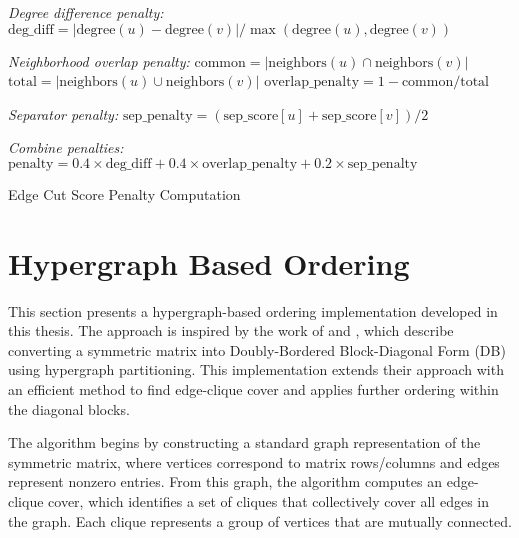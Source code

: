 \begin{algorithm}[H]

    \BlankLine

    \emph{Degree difference penalty:}\;
    $\text{deg\_diff} = |\text{degree}(u) - \text{degree}(v)| / \max(\text{degree}(u), \text{degree}(v))$\;
    \BlankLine

    \emph{Neighborhood overlap penalty:}\;
    $\text{common} = |\text{neighbors}(u) \cap \text{neighbors}(v)|$\;
    $\text{total} = |\text{neighbors}(u) \cup \text{neighbors}(v)|$\;
    $\text{overlap\_penalty} = 1 - \text{common} / \text{total}$\;
    \BlankLine

    \emph{Separator penalty:}\;
    $\text{sep\_penalty} = (\text{sep\_score}[u] + \text{sep\_score}[v]) / 2$\;
    \BlankLine

    \emph{Combine penalties:}\;
    $\text{penalty} = 0.4 \times \text{deg\_diff} + 0.4 \times \text{overlap\_penalty} + 0.2 \times \text{sep\_penalty}$\;

    \;

    \caption{Edge Cut Score Penalty Computation}
    \label{alg:edge_penalty}
\end{algorithm}

\section{Hypergraph Based Ordering}
\label{sec:hypergraph_ordering}

This section presents a hypergraph-based ordering implementation developed in this thesis. The approach is inspired by the work of \cite{catalyurek_hypergraph_2011} and \cite{selvitopi_effect_2020}, which describe converting a symmetric matrix into Doubly-Bordered Block-Diagonal Form (DB) using hypergraph partitioning. This implementation extends their approach with an efficient method to find edge-clique cover and applies further ordering within the diagonal blocks. 

The algorithm begins by constructing a standard graph representation of the symmetric matrix, where vertices correspond to matrix rows/columns and edges represent nonzero entries. From this graph, the algorithm computes an edge-clique cover, which identifies a set of cliques that collectively cover all edges in the graph. Each clique represents a group of vertices that are mutually connected.

